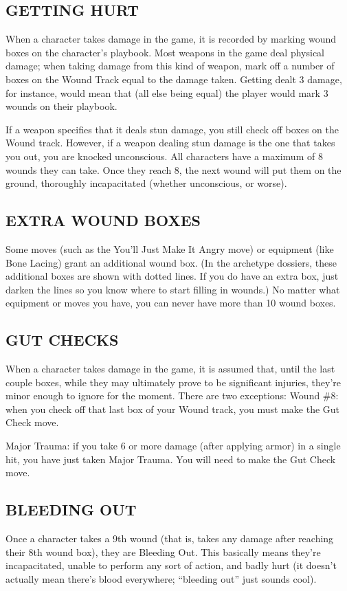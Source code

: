 \subsection*{GETTING HURT}
When a character takes damage in the game, it is recorded by marking wound boxes on the character’s playbook. Most weapons in the game deal physical damage; when taking damage from this kind of weapon, mark off a number of boxes on the Wound Track equal to the damage taken. Getting dealt 3 damage, for instance, would mean that (all else being equal) the player would mark 3 wounds on their playbook.

If a weapon specifies that it deals stun damage, you still check off boxes on the Wound track. However, if a weapon dealing stun damage is the one that takes you out, you are knocked unconscious. All characters have a maximum of 8 wounds they can take. Once they reach 8, the next wound will put them on the ground, thoroughly incapacitated (whether unconscious, or worse).


\subsection*{EXTRA WOUND BOXES}
Some moves (such as the You’ll Just Make It Angry move) or equipment (like Bone Lacing) grant an additional wound box. (In the archetype dossiers, these additional boxes are shown with dotted lines. If you do have an extra box, just darken the lines so you know where to start filling in wounds.) No matter what equipment or moves you have, you can never have more than 10 wound boxes.


\subsection*{GUT CHECKS}

When a character takes damage in the game, it is assumed that, until the last couple boxes, while they may ultimately prove to be significant injuries, they’re minor enough to ignore for the moment. There are two exceptions: Wound \#8: when you check off that last box of your Wound track, you must make the Gut Check move.

Major Trauma: if you take 6 or more damage (after applying armor) in a single hit, you have just taken Major Trauma. You will need to make the Gut Check move.


\subsection*{BLEEDING OUT}
Once a character takes a 9th wound (that is, takes any damage after reaching their 8th wound box), they are Bleeding Out. This basically means they’re incapacitated, unable to perform any sort of action, and badly hurt (it doesn’t actually mean there’s blood everywhere; “bleeding out” just sounds cool).

